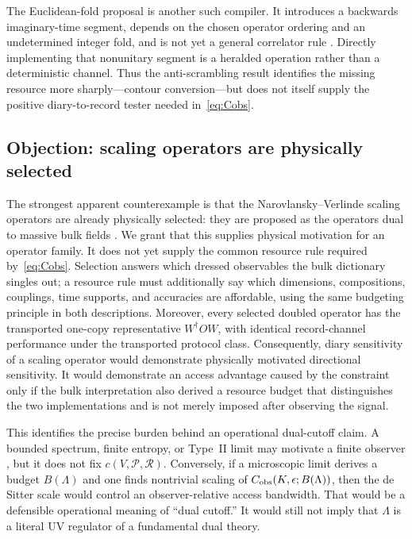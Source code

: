 \documentclass[11pt]{article}
\newcommand{\cP}{\mathcal P}
\newcommand{\cR}{\mathcal R}
\begin{document}
The Euclidean-fold proposal is another such compiler.  It introduces a
backwards imaginary-time segment, depends on the chosen operator ordering and
an undetermined integer fold, and is not yet a general correlator rule
\citep{HarlowZhao2026}.  Directly implementing that nonunitary segment is a
heralded operation rather than a deterministic channel.  Thus the
anti-scrambling result identifies the missing resource more sharply---contour
conversion---but does not itself supply the positive diary-to-record tester
needed in~\eqref{eq:Cobs}.

\subsection*{Objection: scaling operators are physically selected}
The strongest apparent counterexample is that the Narovlansky--Verlinde
scaling operators are already physically selected: they are proposed as the
operators dual to massive bulk fields \citep{NarovlanskyVerlinde2023}.  We
grant that this supplies physical motivation for an operator family.  It does
not yet supply the common resource rule required by~\eqref{eq:Cobs}.
Selection answers which dressed observables the bulk dictionary singles out;
a resource rule must additionally say which dimensions, compositions,
couplings, time supports, and accuracies are affordable, using the same
budgeting principle in both descriptions.  Moreover, every selected doubled
operator has the transported one-copy representative $W^\dagger O W$, with
identical record-channel performance under the transported protocol class.
Consequently, diary sensitivity of a scaling operator would demonstrate
physically motivated directional sensitivity.  It would demonstrate an
access advantage caused by the constraint only if the bulk interpretation
also derived a resource budget that distinguishes the two implementations
and is not merely imposed after observing the signal.

This identifies the precise burden behind an operational dual-cutoff claim.
A bounded spectrum, finite entropy, or Type~II limit may motivate a finite
observer \citep{CLPW,DeVuystObserver}, but it does not fix
$c(V,\cP,\cR)$.  Conversely, if a microscopic limit
derives a budget $B(\Lambda)$ and one finds nontrivial scaling of
$C_{\rm obs}(K,\epsilon;B(\Lambda))$, then the de Sitter scale would control an
observer-relative access bandwidth.  That would be a defensible operational
meaning of ``dual cutoff.''  It would still not imply that $\Lambda$ is a
literal UV regulator of a fundamental dual theory.
\end{document}
